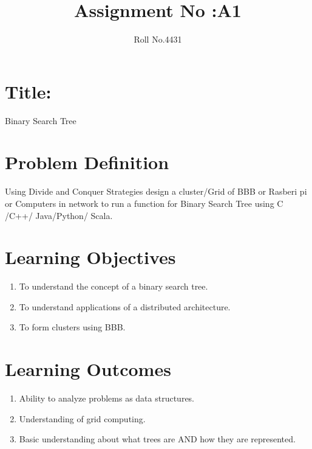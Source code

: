 \documentclass[10pt,a4paper]{article}
\title{Assignment No :A1}
\date{}
\author{Roll No.4431}
\begin{document}
\maketitle
\section{Title:}
Binary Search Tree

\section{Problem Definition}
Using Divide and Conquer Strategies design a cluster/Grid of BBB or Rasberi pi or Computers in network
to run a function for Binary Search Tree using C /C++/ Java/Python/ Scala. 

\section{Learning Objectives}
\begin{enumerate}
\item To understand the concept of a binary search tree.
\item To understand applications of a distributed architecture.
\item To form clusters using BBB.
\end{enumerate}

\section{Learning Outcomes}
\begin{enumerate}
\item Ability to analyze problems as data structures.
\item Understanding of grid computing.
\item Basic understanding about what trees are AND how they are represented.
\end{enumerate}
\end{document}
